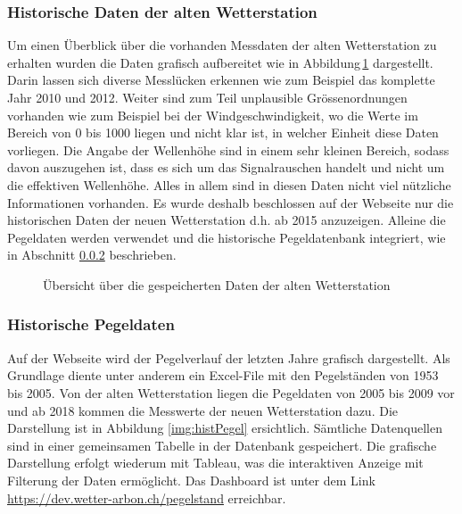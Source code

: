 \subsubsection{Historische Daten der alten Wetterstation}
Um einen Überblick über die vorhanden Messdaten der alten Wetterstation zu erhalten wurden die Daten grafisch aufbereitet wie in Abbildung\,\ref{img:histAlt} dargestellt. Darin lassen sich diverse Messlücken erkennen wie zum Beispiel das komplette Jahr 2010 und 2012. Weiter sind zum Teil unplausible Grössenordnungen vorhanden wie zum Beispiel bei der Windgeschwindigkeit, wo die Werte im Bereich von 0 bis 1000 liegen und nicht klar ist, in welcher Einheit diese Daten vorliegen. Die Angabe der Wellenhöhe sind in einem sehr kleinen Bereich, sodass davon auszugehen ist, dass es sich um das Signalrauschen handelt und nicht um die effektiven Wellenhöhe. Alles in allem sind in diesen Daten nicht viel nützliche Informationen vorhanden. Es wurde deshalb beschlossen auf der Webseite nur die historischen Daten der neuen Wetterstation d.h. ab 2015 anzuzeigen. Alleine die Pegeldaten werden verwendet und die historische Pegeldatenbank integriert, wie in Abschnitt \ref{subsec:pegelhistory} beschrieben.

\begin{figure}[h!]
	\centering
	\caption{Übersicht über die gespeicherten Daten der alten Wetterstation}
	\label{img:histAlt}
\end{figure}



\subsubsection{Historische Pegeldaten}
\label{subsec:pegelhistory}
Auf der Webseite wird der Pegelverlauf der letzten Jahre grafisch dargestellt. Als Grundlage diente unter anderem ein Excel-File mit den Pegelständen von 1953 bis 2005. Von der alten Wetterstation liegen die Pegeldaten von 2005 bis 2009 vor und ab 2018 kommen die Messwerte der neuen Wetterstation dazu. Die Darstellung ist in Abbildung \ref{img:histPegel} ersichtlich. Sämtliche Datenquellen sind in einer gemeinsamen Tabelle in der Datenbank gespeichert. Die grafische Darstellung erfolgt wiederum mit Tableau, was die interaktiven Anzeige mit Filterung der Daten ermöglicht. Das Dashboard ist unter dem Link \url{https://dev.wetter-arbon.ch/pegelstand} erreichbar.

